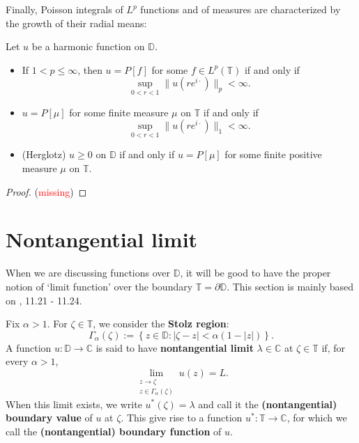 Finally, Poisson integrals of $L^p$ functions and of measures are characterized by the growth
of their radial means:
\begin{theorem}\label{Characterization of Poisson integrals}
Let $u$ be a harmonic function on $\mathbb{D}$.
\begin{itemize}
  \item[(a)] If $1<p\leq\infty$, then $u=P[f]$ for some $f\in L^p(\mathbb{T})$ if and only if
  \begin{equation*}
    \sup_{0<r<1}\|u(re^{i\cdot})\|_p<\infty.
  \end{equation*}
  \item[(b)] $u=P[\mu]$ for some finite measure $\mu$ on $\mathbb{T}$ if and only if
  \begin{equation*}
    \sup_{0<r<1}\|u(re^{i\cdot})\|_1<\infty.
  \end{equation*}
  \item[(c)] (Herglotz) $u\geq 0$ on $\mathbb{D}$ if and only if $u=P[\mu]$ for some finite
  positive measure $\mu$ on $\mathbb{T}$.
\end{itemize}
\end{theorem}

\begin{proof}
(\textcolor{red}{missing})
\end{proof}

\section{Nontangential limit}
When we are discussing functions over $\mathbb{D}$, it will be good to have the proper
notion of `limit function' over the boundary $\mathbb{T}=\partial \mathbb{D}$.
This section is mainly based on \cite{rudin1974real}, 11.21 - 11.24.
\begin{definition}
Fix $\alpha>1$. For $\zeta\in\mathbb{T}$, we consider the \textbf{Stolz region}:
\begin{equation*}
  \Gamma_\alpha(\zeta):=\left\{z\in\mathbb{D}: |\zeta-z|<\alpha(1-|z|)\right\}.
\end{equation*}
A function $u:\mathbb{D}\to\mathbb{C}$ is said to have \textbf{nontangential limit} $\lambda\in\mathbb{C}$
at $\zeta\in\mathbb{T}$ if, for every $\alpha>1$,
\begin{equation*}
  \lim_{\substack{z\to\zeta\\ z\in\Gamma_\alpha(\zeta)}}u(z)=L.
\end{equation*}
When this limit exists, we write $u^*(\zeta)=\lambda$ and call it the \textbf{(nontangential) boundary value} of $u$ at $\zeta$.
This give rise to a function $u^*:\mathbb{T}\rightarrow\mathbb{C}$, for which we call the \textbf{(nontangential) boundary function}
of $u$.
\end{definition}


